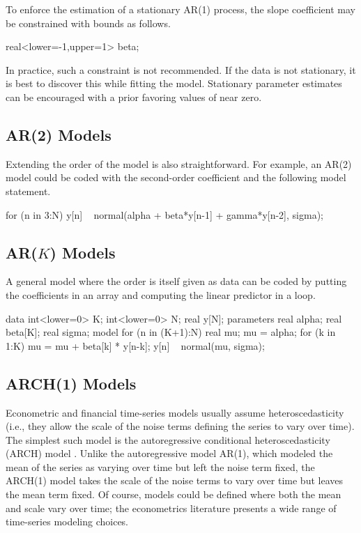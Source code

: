 To enforce the estimation of a stationary AR(1) process, the slope
coefficient  may be constrained with bounds as follows.
%
\begin{stancode}
real<lower=-1,upper=1> beta;
\end{stancode}
%
In practice, such a constraint is not recommended.  If the data is not
stationary, it is best to discover this while fitting the model.
Stationary parameter estimates can be encouraged with a prior favoring
values of  near zero.


\subsection{AR(2) Models}

Extending the order of the model is also straightforward.  For
example, an AR(2) model could be coded with the second-order
coefficient  and the following model statement.
%
\begin{stancode}
for (n in 3:N)
  y[n] ~ normal(alpha + beta*y[n-1] + gamma*y[n-2], sigma);
\end{stancode}


\subsection{AR($K$) Models}

A general model where the order is itself given as data can be coded
by putting the coefficients in an array and computing the linear
predictor in a loop.
%
\begin{stancode}
data {
  int<lower=0> K;
  int<lower=0> N;
  real y[N];
}
parameters {
  real alpha;
  real beta[K];
  real sigma;
}
model {
  for (n in (K+1):N) {
    real mu;
    mu = alpha;
    for (k in 1:K)
      mu = mu + beta[k] * y[n-k];
    y[n] ~ normal(mu, sigma);
  }
}
\end{stancode}

\subsection{ARCH(1) Models}

Econometric and financial time-series models usually assume
heteroscedasticity (i.e., they allow the scale of the noise terms
defining the series to vary over time).
The simplest such model is the autoregressive conditional
heteroscedasticity (ARCH) model \citep{Engle:1982}.  Unlike the
autoregressive model AR(1), which modeled the mean of the series as
varying over time but left the noise term fixed, the ARCH(1) model
takes the scale of the noise terms to vary over time but leaves the
mean term fixed.  Of course, models could be defined where both the
mean and scale vary over time; the econometrics literature presents a
wide range of time-series modeling choices.

